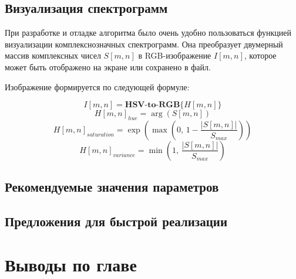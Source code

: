 \subsection{Визуализация спектрограмм}
При разработке и отладке алгоритма было очень удобно пользоваться функцией визуализации комплекснозначных спектрограмм.
Она преобразует двумерный массив комплексных чисел $S[m,n]$ в RGB-изображение $I[m,n]$, которое может быть отображено на экране или сохранено в файл.

Изображение формируется по следующей формуле:

\begin{equation}
  I[m,n] = \textbf{HSV-to-RGB}\{H[m,n]\}
\end{equation}
\[ H[m,n]_{hue} = \arg(S[m,n]) \]
\[ H[m,n]_{saturation} = \exp(\max(0,\, 1 - \frac{|S[m,n]|}{S_{max}})) \]
\[ H[m,n]_{variance} = \min(1,\, \frac{|S[m,n]|}{S_{max}}) \]


\subsection{Рекомендуемые значения параметров}






\subsection{Предложения для быстрой реализации}


\section{Выводы по главе}

